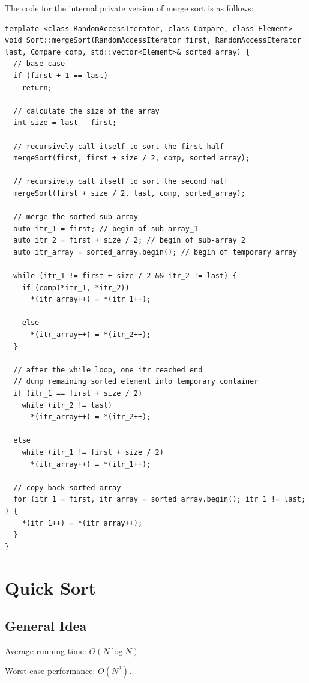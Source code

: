 \documentclass[12pt]{book}
\begin{document}
The code for the internal private version of merge sort is as follows:
\begin{verbatim}
template <class RandomAccessIterator, class Compare, class Element>
void Sort::mergeSort(RandomAccessIterator first, RandomAccessIterator last, Compare comp, std::vector<Element>& sorted_array) {
  // base case 
  if (first + 1 == last)
    return;

  // calculate the size of the array
  int size = last - first;

  // recursively call itself to sort the first half 
  mergeSort(first, first + size / 2, comp, sorted_array);

  // recursively call itself to sort the second half 
  mergeSort(first + size / 2, last, comp, sorted_array);

  // merge the sorted sub-array 
  auto itr_1 = first; // begin of sub-array_1
  auto itr_2 = first + size / 2; // begin of sub-array_2
  auto itr_array = sorted_array.begin(); // begin of temporary array

  while (itr_1 != first + size / 2 && itr_2 != last) {
    if (comp(*itr_1, *itr_2))
      *(itr_array++) = *(itr_1++);

    else 
      *(itr_array++) = *(itr_2++);    
  }

  // after the while loop, one itr reached end
  // dump remaining sorted element into temporary container 
  if (itr_1 == first + size / 2)
    while (itr_2 != last)
      *(itr_array++) = *(itr_2++);

  else
    while (itr_1 != first + size / 2)
      *(itr_array++) = *(itr_1++);

  // copy back sorted array
  for (itr_1 = first, itr_array = sorted_array.begin(); itr_1 != last; ) {
    *(itr_1++) = *(itr_array++);
  }
}

\end{verbatim}
\chapter{Quick Sort}
\label{sec:org6453244}
\section{General Idea}
\label{sec:org723fc9d}

Average running time: \(O(N\log{N})\).

Worst-case performance: \(O(N^2)\).
\end{document}
